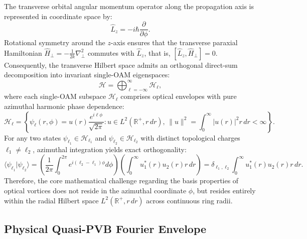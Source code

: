 \documentclass{optica-article}
\begin{document}
The transverse orbital angular momentum operator along the propagation axis is represented in coordinate space by:
\begin{equation}
\hat{L}_z = -i \hbar \frac{\partial}{\partial \phi}.
\label{eq:lz_operator}
\end{equation}
Rotational symmetry around the $z$-axis ensures that the transverse paraxial Hamiltonian $\hat{H}_\perp = -\frac{1}{2k} \nabla_\perp^2$ commutes with $\hat{L}_z$, that is, $[\hat{L}_z, \hat{H}_\perp] = 0$. Consequently, the transverse Hilbert space admits an orthogonal direct-sum decomposition into invariant single-OAM eigenspaces:
\begin{equation}
\mathcal{H} = \bigoplus_{\ell=-\infty}^\infty \mathcal{H}_\ell,
\label{eq:direct_sum_decomposition}
\end{equation}
where each single-OAM subspace $\mathcal{H}_\ell$ comprises optical envelopes with pure azimuthal harmonic phase dependence:
\begin{equation}
\mathcal{H}_\ell = \left\{ \psi_\ell(r, \phi) = u(r) \frac{e^{i \ell \phi}}{\sqrt{2\pi}} : u \in L^2(\mathbb{R}^+, r \, dr), \, \|u\|^2 = \int_0^\infty |u(r)|^2 r \, dr < \infty \right\}.
\label{eq:single_oam_subspace}
\end{equation}
For any two states $\psi_{\ell_1} \in \mathcal{H}_{\ell_1}$ and $\psi_{\ell_2} \in \mathcal{H}_{\ell_2}$ with distinct topological charges $\ell_1 \neq \ell_2$, azimuthal integration yields exact orthogonality:
\begin{equation}
\langle \psi_{\ell_1} | \psi_{\ell_2} \rangle = \left( \frac{1}{2\pi} \int_0^{2\pi} e^{i(\ell_2 - \ell_1)\phi} d\phi \right) \left( \int_0^\infty u_1^*(r) u_2(r) r \, dr \right) = \delta_{\ell_1, \ell_2} \int_0^\infty u_1^*(r) u_2(r) r \, dr.
\label{eq:azimuthal_orthogonality}
\end{equation}
Therefore, the core mathematical challenge regarding the basis properties of optical vortices does not reside in the azimuthal coordinate $\phi$, but resides entirely within the radial Hilbert space $L^2(\mathbb{R}^+, r \, dr)$ across continuous ring radii.

\subsection{Physical Quasi-PVB Fourier Envelope}
\end{document}

